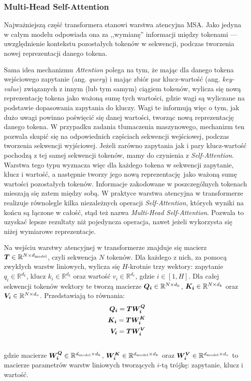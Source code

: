 \subsubsection{Multi-Head Self-Attention}

Najważniejszą część transformera stanowi warstwa atencyjna MSA. Jako jedyna w całym modelu
odpowiada ona za ,,wymianę'' informacji między tokenami --- uwzględnienie kontekstu pozostałych
tokenów w sekwencji, podczas tworzenia nowej reprezentacji danego tokena.

Sama idea mechanizmu \emph{Attention} polega na tym, że mając dla danego tokena wejściowego
zapytanie (ang. \emph{query}) i mając zbiór par klucz-wartość (ang. \emph{key-value}) związanych z
innym (lub tym samym) ciągiem tokenów, wylicza się nową reprezentację tokena jako ważoną sumę tych
wartości, gdzie wagi są wyliczane na podstawie dopasowania zapytania do kluczy. Wagi te informują
więc o tym, jak dużo uwagi powinno poświęcić się danej wartości, tworząc nową reprezentację danego
tokena. W przypadku zadania tłumaczenia maszynowego, mechanizm ten pozwala skupić się na
odpowiednich częściach sekwencji wejściowej, podczas tworzenia sekwencji wyjściowej. Jeżeli zarówno
zapytania jak i pary klucz-wartość pochodzą z tej samej sekwencji tokenów, mamy do czynienia z
\emph{Self-Attention}. Warstwa tego typu wyznacza więc dla każdego tokena w sekwencji zapytanie,
klucz i wartość, a następnie tworzy jego nową reprezentację jako ważoną sumę wartości pozostałych
tokenów. Informacje zakodowane w poszczególnych tokenach mieszają się zatem między sobą. W praktyce
warstwa atencyjna w transformerze realizuje równolegle kilka niezależnych operacji
\emph{Self-Attention}, których wyniki na końcu są łączone w całość, stąd też nazwa \emph{Multi-Head
Self-Attention}. Pozwala to uzyskać lepsze rezultaty niż pojedyncza operacja, nawet jeżeli
wykorzysta się niżej wymiarowe reprezentacje.

Na wejściu warstwy atencyjnej w transformerze znajduje się macierz
$\boldsymbol{T} \in \mathbb{R}^{N \times d_{\mathrm{model}}}$, czyli sekwencja $N$ tokenów. Dla każdego z nich, za pomocą
zwykłych warstw liniowych, wylicza się $H$-krotnie trzy wektory: zapytanie $q_i \in
\mathbb{R}^{d_k}$, klucz $k_i \in \mathbb{R}^{d_k}$ oraz wartość $v_i \in \mathbb{R}^{d_v}$, gdzie
$i \in [1, H]$. Dla całej sekwencji tokenów wektory te tworzą macierze $\boldsymbol{Q_i} \in \mathbb{R}^{N \times d_k}$,
$\boldsymbol{K_i} \in \mathbb{R}^{N \times d_k}$ oraz $\boldsymbol{V_i} \in \mathbb{R}^{N \times d_v}$. Przedstawiają to równania:
\begin{eqnarray}
    \boldsymbol{Q_i} = \boldsymbol{T} \boldsymbol{W_i^Q} \\\
    \boldsymbol{K_i} = \boldsymbol{T} \boldsymbol{W_i^K} \\\
    \boldsymbol{V_i} = \boldsymbol{T} \boldsymbol{W_i^V} \\\
\end{eqnarray}
gdzie macierze $\boldsymbol{W_i^Q} \in \mathbb{R}^{d_{\mathrm{model}} \times d_k}$,
$\boldsymbol{W_i^K} \in \mathbb{R}^{d_{\mathrm{model}} \times d_k}$ oraz $\boldsymbol{W_i^V} \in \mathbb{R}^{d_{\mathrm{model}} \times d_v}$ to
macierze parametrów warstw liniowych tworzących $i$-tą trójkę: zapytanie, klucz i wartość.

